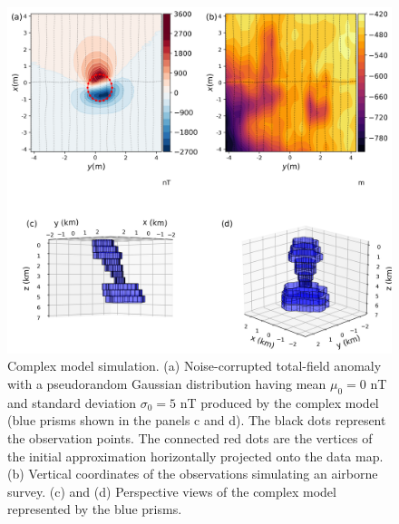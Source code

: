 \begin{figure}
    \centering
    \includegraphics[width=\linewidth]{figures/complex_model_data.png}
    \caption{Complex model simulation. (a) Noise-corrupted total-field anomaly with a pseudorandom Gaussian distribution having mean $\mu_0 = 0$ nT and standard deviation $\sigma_0 = 5$ nT produced by the complex model (blue prisms shown in the panels c and d). The black dots represent the observation points. The connected red dots are the vertices of the initial approximation horizontally projected onto the data map. (b) Vertical coordinates of the observations simulating an airborne survey. (c) and (d) Perspective views of the complex model represented by the blue prisms.
}
    \label{fig:complex_model}
\end{figure}

